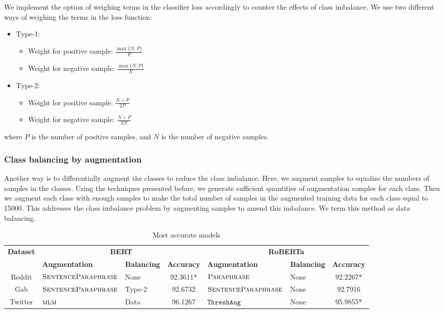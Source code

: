\documentclass[11pt,a4paper]{article}
\newcommand{\senttfpara}{$\textsc{SentenceParaphrase}$}
\newcommand{\tfpara}{$\textsc{Paraphrase}$}
\newcommand{\mlm}{$\textsc{mlm}$}
\newcommand{\threshaug}{$\texttt{ThreshAug}$}
\begin{document}
We implement the option of weighing terms in the classifier loss accordingly to counter the effects of class imbalance. We use two different ways of weighing the terms in the loss function:
\begin{itemize}
    \item Type-1: 
    \begin{itemize}
        \item Weight for positive sample: $\frac{\max \{N, P\}}{P}$
        \item Weight for negative sample: $\frac{\max \{N, P\}}{N}$
    \end{itemize}
    \item Type-2:
    \begin{itemize}
        \item Weight for positive sample: $\frac{N + P}{2P}$
        \item Weight for negative sample: $\frac{N + P}{2N}$
    \end{itemize}
\end{itemize}

where $P$ is the number of positive samples, and $N$ is the number of negative samples.

\subsubsection{Class balancing by augmentation}
Another way is to differentially augment the classes to reduce the class imbalance. Here, we augment samples to equalize the numbers of samples in the classes. Using the techniques presented before, we generate sufficient quantities of augmentation samples for each class. Then we augment each class with enough samples to make the total number of samples in the augmented training data for each class equal to 15000. This addresses the class imbalance problem by augmenting samples to amend this imbalance. We term this method as data balancing.%

\begin{table}[]
    \small
    \centering
    \begin{tabular}{cllcllc}
    \toprule
        \multirow{2}{*}{\textbf{Dataset}} & \multicolumn{3}{c}{\textbf{BERT}} & \multicolumn{3}{c}{\textbf{RoBERTa}} \\\cmidrule(lr){2-4}\cmidrule(lr){5-7}
         & \textbf{Augmentation} & \textbf{Balancing} & \textbf{Accuracy} & \textbf{Augmentation} & \textbf{Balancing} & \textbf{Accuracy} \\
         \midrule
         Reddit & \senttfpara & None & 92.3611* & \tfpara & None & 92.2267*\\
         Gab & \senttfpara & Type-2 & 92.6732 & \senttfpara & None & 92.7916 \\
         Twitter & \mlm & Data & 96.1267 & \threshaug & None & 95.9855* \\
    \bottomrule
    \end{tabular}
    \caption{Most accurate models}
    \label{tab:bestmodels}
\end{table}
\end{document}
